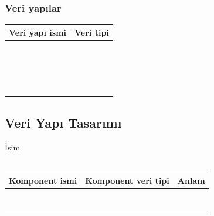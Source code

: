 \documentclass[12pt, a4paper]{article}
\newcommand\fillin[1][3cm]{\makebox[#1]{\dotfill}}
\begin{document}
\subsubsection*{Veri yapılar}
\begin{tabular}{| p{4cm} | p{11cm} |  }
\hline			
Veri yapı ismi&Veri tipi\\
\hline
& \\[2ex]
\hline  
& \\[2ex]
\hline  
& \\[2ex]
\hline  
& \\[2ex]
\hline  
& \\[2ex]
\hline  
& \\[2ex]
\hline  
& \\[2ex]
\hline  
& \\[2ex]
\hline  
& \\[2ex]
\hline  
& \\[2ex]
\hline  
& \\[2ex]
\hline  
& \\[2ex]
\hline  
& \\[2ex]
\hline  
& \\[2ex]
\hline  
& \\[2ex]
\hline  
& \\[2ex]
\hline  
& \\[2ex]
\hline  
& \\[2ex]
\hline  
\end{tabular}




\newpage
\subsection*{Veri Yapı Tasarımı}
İsim  \fillin[5cm]\\
\vspace{0.5cm}\\
\begin{tabular}{| p{4cm} | p{4cm} | p{8cm} |  }
\hline			
Komponent ismi&Komponent veri tipi&Anlam\\
\hline
& & \\[10ex]
\hline  
& & \\[10ex]
\hline  
& & \\[10ex]
\hline  
& & \\[10ex]
\hline  
& & \\[10ex]
\hline  
& & \\[10ex]
\hline  
& & \\[10ex]
\hline  
\end{tabular}
\end{document}
